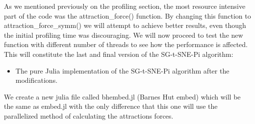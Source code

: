 As we mentioned previously on the profiling section, the most resource intensive part
of the code was the attraction\_force() function. By changing this function to attraction\_force\_symm()
we will attempt to achieve better results, even though the initial profiling time was discouraging. 
We will now proceed to test the new function with different number of threads to see how the
performance is affected. This will constitute the last and final version of the SG-t-SNE-Pi algorithm:
\begin{itemize}
    \item The pure Julia implementation of the SG-t-SNE-Pi algorithm after the modifications.
\end{itemize}

We create a new julia file called bhembed.jl (Barnes Hut embed) which will be the same as embed.jl 
with the only difference that this one will use the parallelized method of calculating the attractions forces.
